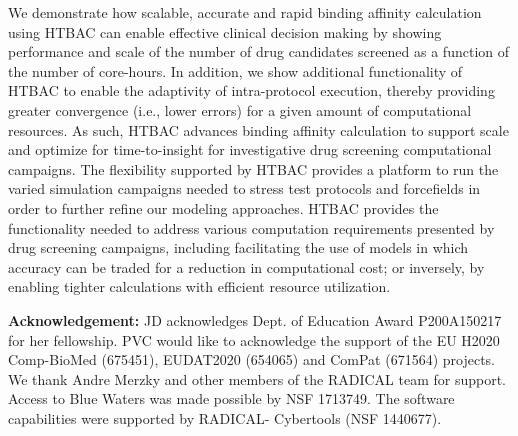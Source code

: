 \documentclass[conference]{IEEEtran}
\begin{document}




We demonstrate how scalable, accurate and rapid binding affinity calculation 
using HTBAC can enable effective clinical decision making by showing performance 
and scale of the number of drug candidates screened as a function of the 
number of core-hours. In addition, we show additional functionality of HTBAC 
to enable the adaptivity of intra-protocol execution, thereby providing greater 
convergence (i.e., lower errors) for a given amount of computational resources. 
As such, HTBAC advances binding affinity calculation to support scale and 
optimize for time-to-insight for investigative drug screening computational 
campaigns. The flexibility supported by HTBAC provides a platform to run the 
varied simulation campaigns needed to stress test protocols and forcefields in 
order to further refine our modeling approaches. HTBAC provides the 
functionality needed to address various computation requirements presented by 
drug screening campaigns, including facilitating the use of models in which  
accuracy can be traded for a reduction in computational cost; or inversely, by  
enabling tighter calculations with efficient resource utilization. 


{\footnotesize {\bf Acknowledgement: }JD acknowledges Dept. of Education Award P200A150217
for her fellowship. PVC would like to acknowledge the support of the EU H2020
Comp-BioMed (675451), EUDAT2020 (654065) and ComPat (671564) projects. We
thank Andre Merzky and other members of the RADICAL team for support. Access
to Blue Waters was made possible by NSF 1713749. The software capabilities
were supported by RADICAL- Cybertools (NSF 1440677).}



\end{document}
